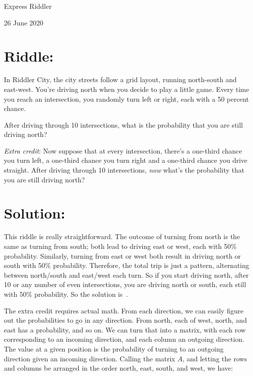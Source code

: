 \documentclass{article}
\begin{document}
\pagestyle{empty} %

\begin{center}
{\LARGE Express Riddler}

\vspace{0.15in}

{\Large 26 June 2020}
\end{center}


\section*{Riddle:}

In Riddler City, the city streets follow a grid layout, running north-south and east-west. You're driving north when you decide to play a little game.
Every time you reach an intersection, you randomly turn left or right, each with a 50 percent chance.

After driving through 10 intersections, what is the probability that you are still driving north?

\textit{Extra credit}: Now suppose that at every intersection, there's a one-third chance you turn left, a one-third chance you turn right and a one-third chance you drive straight.
After driving through 10 intersections, \textit{now} what's the probability that you are still driving north?

\section*{Solution:}

This riddle is really straightforward.
The outcome of turning from north is the same as turning from south; both lead to driving east or west, each with 50\% probability.
Similarly, turning from east or west both result in driving north or south with 50\% probability.
Therefore, the total trip is just a pattern, alternating between north/south and east/west each turn.
So if you start driving north, after 10 or any number of even intersections, you are driving north or south, each still with 50\% probability.
So the solution is
\,.

The extra credit requires actual math.
From each direction, we can easily figure out the probabilities to go in any direction.
From north, each of west, north, and east has a  probability, and so on.
We can turn that into a matrix, with each row corresponding to an incoming direction, and each column an outgoing direction.
The value at a given position is the probability of turning to an outgoing direction given an incoming direction.
Calling the matrix $A$, and letting the rows and columns be arranged in the order north, east, south, and west, we have:
\end{document}
